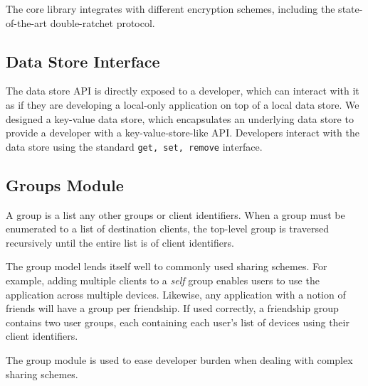  The core library integrates with different encryption schemes, including the state-of-the-art double-ratchet protocol. 


\subsection{Data Store Interface}

The data store API is directly exposed to a developer, which can interact with it as if they are developing a local-only application on top of a local data store. We designed a \name{} key-value data store, which encapsulates an underlying data store to provide a developer with a key-value-store-like API. Developers interact with the data store using the standard \texttt{get, set, remove} interface. 


\subsection{Groups Module}


A group is a list any other groups or client identifiers. When a group must be enumerated to a list of destination clients, the top-level group is traversed recursively until the entire list is of client identifiers.

The group model lends itself well to commonly used sharing schemes. For example, adding multiple clients to a \textit{self} group enables users to use the application across multiple devices. Likewise, any application with a notion of friends will have a group per friendship. If used correctly, a friendship group contains two user groups, each containing each user's list of devices using their client identifiers.

The group module is used to ease developer burden when dealing with complex sharing schemes. 

